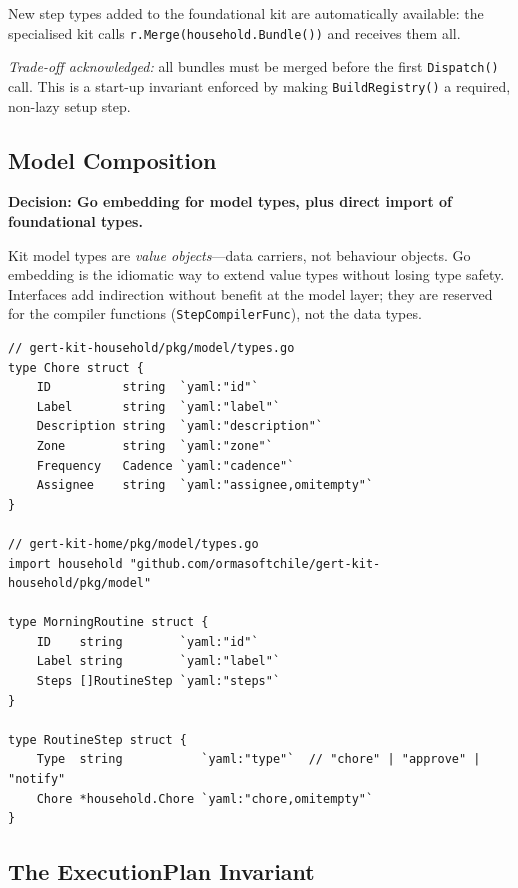 New step types added to the foundational kit are automatically available: the
specialised kit calls \texttt{r.Merge(household.Bundle())} and receives them
all.

\textit{Trade-off acknowledged:} all bundles must be merged before the first
\texttt{Dispatch()} call.  This is a start-up invariant enforced by making
\texttt{BuildRegistry()} a required, non-lazy setup step.

\subsection{Model Composition}
\label{subsec:kit-model-composition}

\textbf{Decision: Go embedding for model types, plus direct import of
foundational types.}

Kit model types are \emph{value objects}---data carriers, not behaviour objects.
Go embedding is the idiomatic way to extend value types without losing type
safety.  Interfaces add indirection without benefit at the model layer; they
are reserved for the compiler functions (\texttt{StepCompilerFunc}), not the
data types.

\begin{verbatim}
// gert-kit-household/pkg/model/types.go
type Chore struct {
    ID          string  `yaml:"id"`
    Label       string  `yaml:"label"`
    Description string  `yaml:"description"`
    Zone        string  `yaml:"zone"`
    Frequency   Cadence `yaml:"cadence"`
    Assignee    string  `yaml:"assignee,omitempty"`
}

// gert-kit-home/pkg/model/types.go
import household "github.com/ormasoftchile/gert-kit-household/pkg/model"

type MorningRoutine struct {
    ID    string        `yaml:"id"`
    Label string        `yaml:"label"`
    Steps []RoutineStep `yaml:"steps"`
}

type RoutineStep struct {
    Type  string           `yaml:"type"`  // "chore" | "approve" | "notify"
    Chore *household.Chore `yaml:"chore,omitempty"`
}
\end{verbatim}

\subsection{The ExecutionPlan Invariant}
\label{subsec:kit-invariant}

